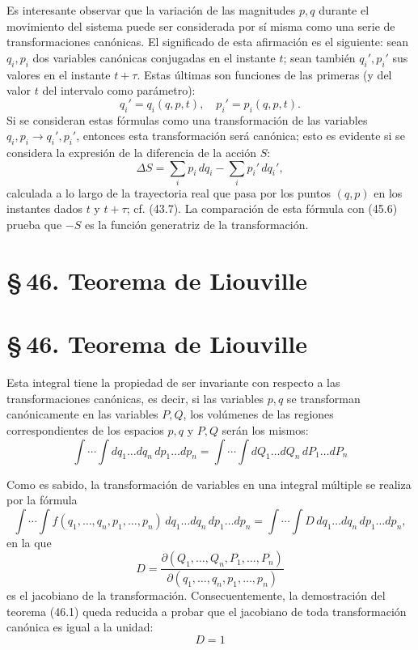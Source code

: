 \documentclass[12pt]{article}
\begin{document}
Es interesante observar que la variación de las magnitudes \(p,q\) durante el movimiento del sistema puede ser considerada por sí misma como una serie de transformaciones canónicas. El significado de esta afirmación es el siguiente: sean \(q_i,p_i\) dos variables canónicas conjugadas en el instante \(t\); sean también \(q_i',p_i'\) sus valores en el instante \(t+\tau\). Estas últimas son funciones de las primeras (y del valor \(t\) del intervalo como parámetro):
\[
q_i' = q_i(q,p,t),\quad
p_i' = p_i(q,p,t).
\]
Si se consideran estas fórmulas como una transformación de las variables \(q_i,p_i\to q_i',p_i'\), entonces esta transformación será canónica; esto es evidente si se considera la expresión de la diferencia de la acción \(S\):
\[
\Delta S = \sum_i p_i\,dq_i - \sum_i p_i'\,dq_i',
\]
calculada a lo largo de la trayectoria real que pasa por los puntos \((q,p)\) en los instantes dados \(t\) y \(t+\tau\); cf. (43.7). La comparación de esta fórmula con (45.6) prueba que \(-S\) es la función generatriz de la transformación.

\section*{\S\,46. Teorema de Liouville}
\section*{\S\,46. Teorema de Liouville}

\noindent Esta integral tiene la propiedad de ser invariante con respecto a las transformaciones canónicas, es decir, si las variables \(p,q\) se transforman canónicamente en las variables \(P,Q\), los volúmenes de las regiones correspondientes de los espacios \(p,q\) y \(P,Q\) serán los mismos:
\begin{equation}
\int\cdots\int dq_1\ldots dq_n\,dp_1\ldots dp_n
=
\int\cdots\int dQ_1\ldots dQ_n\,dP_1\ldots dP_n
\tag{46.1}
\end{equation}

\noindent Como es sabido, la transformación de variables en una integral múltiple se realiza por la fórmula
\[
\int\cdots\int f(q_1,\dots,q_n,p_1,\dots,p_n)\,dq_1\ldots dq_n\,dp_1\ldots dp_n
=
\int\cdots\int D\,dq_1\ldots dq_n\,dp_1\ldots dp_n,
\]
en la que
\begin{equation}
D = \frac{\partial(Q_1,\dots,Q_n,P_1,\dots,P_n)}{\partial(q_1,\dots,q_n,p_1,\dots,p_n)}
\tag{46.2}
\end{equation}
es el jacobiano de la transformación. Consecuentemente, la demostración del teorema (46.1) queda reducida a probar que el jacobiano de toda transformación canónica es igual a la unidad:
\begin{equation}
D = 1
\tag{46.3}
\end{equation}
\end{document}
